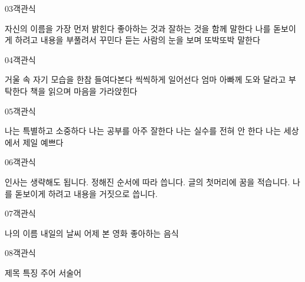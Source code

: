 \documentclass[fs13,seriesSau]{korfarm-base}
\begin{document}
\begin{kfQBlock}{03}{객관식}
\begin{kfChoices}
\kfChoice 자신의 이름을 가장 먼저 밝힌다
\kfChoice 좋아하는 것과 잘하는 것을 함께 말한다
\kfChoice 나를 돋보이게 하려고 내용을 부풀려서 꾸민다
\kfChoice 듣는 사람의 눈을 보며 또박또박 말한다
\end{kfChoices}
\end{kfQBlock}

\begin{kfQBlock}{04}{객관식}
\begin{kfChoices}
\kfChoice 거울 속 자기 모습을 한참 들여다본다
\kfChoice 씩씩하게 일어선다
\kfChoice 엄마 아빠께 도와 달라고 부탁한다
\kfChoice 책을 읽으며 마음을 가라앉힌다
\end{kfChoices}
\end{kfQBlock}

\begin{kfQBlock}{05}{객관식}
\begin{kfChoices}
\kfChoice 나는 특별하고 소중하다
\kfChoice 나는 공부를 아주 잘한다
\kfChoice 나는 실수를 전혀 안 한다
\kfChoice 나는 세상에서 제일 예쁘다
\end{kfChoices}
\end{kfQBlock}

\begin{kfQBlock}{06}{객관식}
\begin{kfChoices}
\kfChoice 인사는 생략해도 됩니다.
\kfChoice 정해진 순서에 따라 씁니다.
\kfChoice 글의 첫머리에 꿈을 적습니다.
\kfChoice 나를 돋보이게 하려고 내용을 거짓으로 씁니다.
\end{kfChoices}
\end{kfQBlock}

\begin{kfQBlock}{07}{객관식}
\begin{kfChoices}
\kfChoice 나의 이름
\kfChoice 내일의 날씨
\kfChoice 어제 본 영화
\kfChoice 좋아하는 음식
\end{kfChoices}
\end{kfQBlock}

\begin{kfQBlock}{08}{객관식}
\begin{kfChoices}
\kfChoice 제목
\kfChoice 특징
\kfChoice 주어
\kfChoice 서술어
\end{kfChoices}
\end{kfQBlock}
\end{document}
